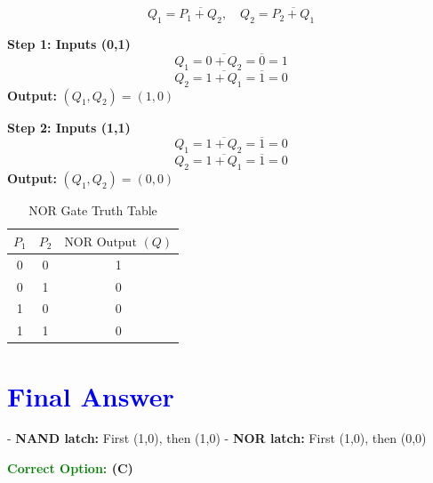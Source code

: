 \documentclass[a4paper,12pt]{article}
\begin{document}
\[
Q_1 = \overline{P_1 + Q_2}, \quad Q_2 = \overline{P_2 + Q_1}
\]

\textbf{Step 1: Inputs (0,1)}
\[
Q_1 = \overline{0 + Q_2} = \overline{0} = 1
\]
\[
Q_2 = \overline{1 + Q_1} = \overline{1} = 0
\]
\textbf{Output:} \( (Q_1, Q_2) = (1,0) \)

\textbf{Step 2: Inputs (1,1)}
\[
Q_1 = \overline{1 + Q_2} = \overline{1} = 0
\]
\[
Q_2 = \overline{1 + Q_1} = \overline{1} = 0
\]
\textbf{Output:} \( (Q_1, Q_2) = (0,0) \)

\begin{table}[h]
    \centering
    \renewcommand{\arraystretch}{1.2}
    \begin{tabular}{|c|c|c|}
        \hline
        $P_1$ & $P_2$ & $\text{NOR Output } (Q)$ \\
        \hline
        0 & 0 & 1 \\
        0 & 1 & 0 \\
        1 & 0 & 0 \\
        1 & 1 & 0 \\
        \hline
    \end{tabular}
    \caption{NOR Gate Truth Table}
\end{table}

\section*{\textcolor{blue}{Final Answer}}
- \textbf{NAND latch:} First (1,0), then (1,0)
- \textbf{NOR latch:} First (1,0), then (0,0)

\textbf{\textcolor{green}{Correct Option:} (C)}
\end{document}
